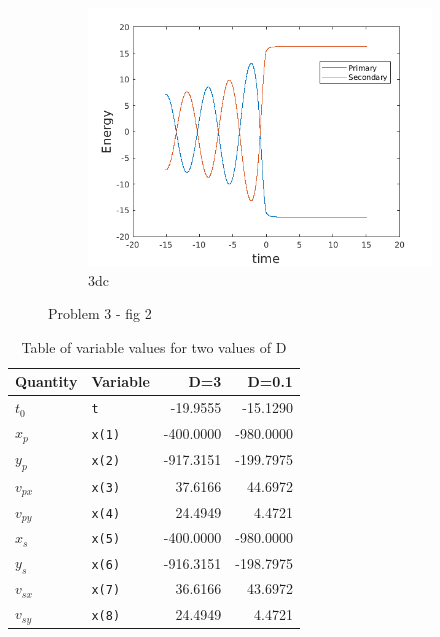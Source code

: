 \documentclass[a4paper]{article}
\begin{document}
\begin{figure}
				\begin{subfigure} {\columnwidth}
					\centering
					\includegraphics[width=.5\columnwidth]{../plots/3d_energy.png}
					\caption{3dc}
					\label{fig:3dc}
				\end{subfigure}
				\caption{Problem 3 - fig 2}
				\label{fig:3.2}
			\end{figure}
			
			\begin{table}
				\centering
				\begin{tabular} {l l r r}
					\toprule
					\textbf{Quantity} & \textbf{Variable} & \textbf{D=3} & \textbf{D=0.1}\\
					\midrule
					\(t^{}_{0}\) & \texttt{t} & -19.9555 & -15.1290 \\
					\(x^{}_{p}\) & \texttt{x(1)}& -400.0000 & -980.0000 \\
					\(y^{}_{p}\) & \texttt{x(2)} & -917.3151 & -199.7975 \\
					\(v^{}_{px}\) & \texttt{x(3)} & 37.6166 & 44.6972 \\
					\(v^{}_{py}\) & \texttt{x(4)} & 24.4949 & 4.4721 \\
					\(x^{}_{s}\) & \texttt{x(5)} & -400.0000 & -980.0000 \\
					\(y^{}_{s}\) & \texttt{x(6)} & -916.3151 & -198.7975 \\
					\(v^{}_{sx}\) & \texttt{x(7)} & 36.6166 & 43.6972 \\
					\(v^{}_{sy}\) & \texttt{x(8)} & 24.4949 & 4.4721 \\
					\bottomrule
				\end{tabular}
				\caption{Table of variable values for two values of D}
				\label{table:dvalues}
			\end{table}
			
			
			
			
\end{document}
